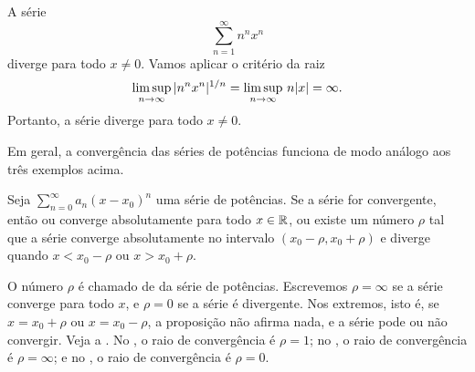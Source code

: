 \begin{example} \label{ps:divergeex}
A série
\begin{equation*}
\sum_{n=1}^\infty n^n x^n
\end{equation*}
diverge para todo $x \neq 0$. Vamos aplicar o critério da raiz
\begin{equation*}
\limsup_{n\to\infty}
\,
\lvert {n^n x^n} \rvert^{1/n}
=
\limsup_{n\to\infty}
\,
n \lvert {x} \rvert
= \infty .
\end{equation*}
Portanto, a série diverge para todo $x \neq 0$.
\end{example}

Em geral, a convergência das séries de potências funciona de modo análogo
aos três exemplos acima.

\begin{prop} \label{prop:powerserrealradius}
Seja $\sum_{n=0}^\infty a_n {(x-x_0)}^n$ uma série de potências.
Se a série for convergente, então ou converge absolutamente para
todo $x \in {\mathbb{R}}$, ou
existe um número $\rho$ tal que
a série converge absolutamente no intervalo
$(x_0-\rho,x_0+\rho)$ e diverge quando $x < x_0-\rho$ ou $x > x_0+\rho$.
\end{prop}

O número $\rho$ é chamado de \emph{} da
série de potências. Escrevemos $\rho = \infty$ se a série converge para
todo $x$, e $\rho = 0$ se a série é divergente.
Nos extremos, isto é, se $x = x_0+\rho$ ou $x = x_0-\rho$,
a proposição não afirma nada,
e a série pode ou não convergir.
Veja a .
No ,
o raio de convergência é $\rho=1$;
no , o raio de convergência é $\rho=\infty$;
e no , o raio de convergência é $\rho=0$.

\begin{myfigureht}
\caption{Convergência de uma série de potências.\label{ps:convfig}}
\end{myfigureht}

